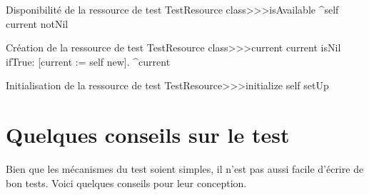 \documentclass[a4paper,10pt,twoside]{book}
\begin{document}
{
\begin{method}[testresourceisavailable]{Disponibilité de la ressource de test}
TestResource class>>>isAvailable
	^self current notNil
\end{method}
\begin{method}[testresourcecurrent]{Création de la ressource de test}
TestResource class>>>current
	current isNil ifTrue: [current := self new].
	^current
\end{method}
\begin{method}[restresourceinitialize]{Initialisation de la ressource de test}
TestResource>>>initialize
	self setUp
\end{method}
\section{Quelques conseils sur le test}

Bien que les mécanismes du test soient simples, il n'est pas aussi facile d'écrire de bon tests.
Voici quelques conseils pour leur conception.

\begin{description}


\end{description}}
\end{document}
